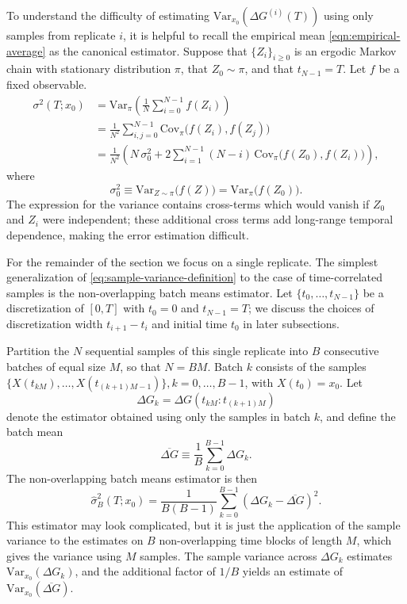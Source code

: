 \documentclass[9pt,bestpractices]{livecoms}
\begin{document}
To understand the difficulty of estimating $\mathrm{Var}_{x_0}(\Delta G^{(i)}(T))$ using only samples from replicate $i$, it is helpful to recall the empirical mean \eqref{eqn:empirical-average} as the canonical estimator. Suppose that $\{Z_i\}_{i\ge 0}$ is an ergodic Markov chain with stationary distribution $\pi$, that $Z_0 \sim \pi$, and that $t_{N-1}=T$. Let $f$ be a fixed observable. 
\begin{align}
\sigma^2(T;x_0) &= \mathrm{Var}_{\pi}\!\left(\frac{1}{N}\sum_{i=0}^{N-1} f(Z_i) \right) \\
&= \frac{1}{N^2}\sum_{i,j=0}^{N-1}
\mathrm{Cov}_{\pi}\!\bigl(f(Z_i), f(Z_j)\bigr) \\
&= \frac{1}{N^2}\left(
N\,\sigma_0^2
+ 2\sum_{i=1}^{N-1} (N-i)\,
\mathrm{Cov}_{\pi}\!\bigl(f(Z_0), f(Z_i)\bigr)
\right),
\label{eqn:variance-of-empirical-mean-long}
\end{align}
where
\[
\sigma_0^2 \equiv \mathrm{Var}_{Z\sim \pi}\!\bigl(f(Z)\bigr)
= \mathrm{Var}_{\pi}\!\bigl(f(Z_0)\bigr).
\]
The expression for the variance contains cross-terms which would vanish if $Z_0$ and $Z_i$ were independent; these additional cross terms add long-range temporal dependence, making the error estimation difficult. 

For the remainder of the section we focus on a single replicate. The simplest generalization of \eqref{eq:sample-variance-definition} to the case of time-correlated samples is the non-overlapping batch means estimator. Let $\{t_0,\dots,t_{N-1}\}$ be a discretization of $[0,T]$ with $t_0=0$ and $t_{N-1}=T$;  we discuss the choices of discretization width $t_{i+1} - t_i$ and initial time $t_0$ in later subsections. 

Partition the $N$ sequential samples of this single replicate into $B$ consecutive batches of equal size $M$, so that $N = BM$. Batch $k$ consists of the samples $\{X(t_{kM}),\dots,X(t_{(k+1)M-1})\}, k=0,\dots,B-1$, with $X(t_0) = x_0$. Let
\[
\Delta G_k = \Delta G(t_{kM}:t_{(k+1)M})
\]
denote the estimator obtained using only the samples in batch $k$, and define the batch mean
\[
\overline{\Delta G} \equiv \frac{1}{B}\sum_{k=0}^{B-1} \Delta G_k .
\]
The non-overlapping batch means estimator is then
\[
\hat\sigma_B^2(T;x_0)
= \frac{1}{B(B-1)}\sum_{k=0}^{B-1}
\left(\Delta G_k - \overline{\Delta G}\right)^2 .
\]
This estimator may look complicated, but it is just the application of the sample variance to the estimates on  $B$ non-overlapping time blocks of length $M$, which gives the variance using $M$ samples. The sample variance across $\Delta G_k$ estimates $\mathrm{Var}_{x_0}(\Delta G_k)$, and the additional factor of $1/B$ yields an estimate of $\mathrm{Var}_{x_0}(\overline{\Delta G})$.
\end{document}
